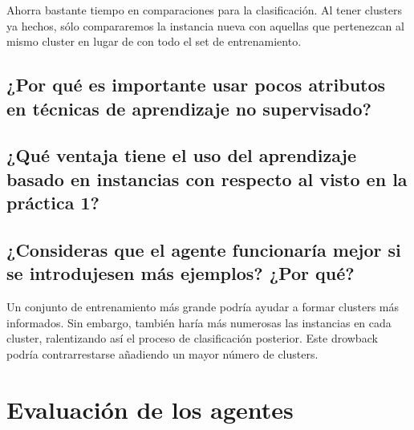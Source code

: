 \documentclass[12pt]{article}
\begin{document}
Ahorra bastante tiempo en comparaciones para la clasificación. Al tener clusters ya hechos, sólo compararemos la instancia nueva con aquellas que pertenezcan al mismo cluster en lugar de con todo el set de entrenamiento.

\subsection{¿Por qué es importante usar pocos atributos en técnicas de aprendizaje no supervisado?}


\subsection{¿Qué ventaja tiene el uso del aprendizaje basado en instancias con respecto al visto en la práctica 1?}


\subsection{¿Consideras que el agente funcionaría mejor si se introdujesen más ejemplos? ¿Por qué?}

Un conjunto de entrenamiento más grande podría ayudar a formar clusters más informados. Sin embargo, también haría más numerosas las instancias en cada cluster, ralentizando así el proceso de clasificación posterior. Este drowback podría contrarrestarse añadiendo un mayor número de clusters.

\section{Evaluación de los agentes}



\end{document}
